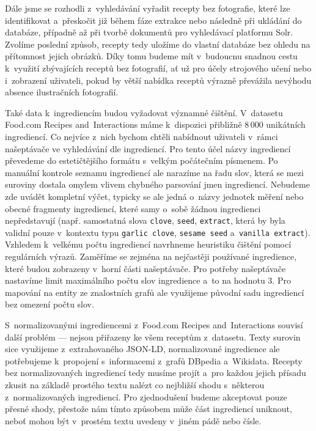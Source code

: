 Dále jsme se rozhodli z~vyhledávání vyřadit recepty bez fotografie, které lze identifikovat a~přeskočit již během fáze extrakce nebo následně při ukládání do databáze, případně až při tvorbě dokumentů pro vyhledávací platformu Solr. Zvolíme poslední způsob, recepty tedy uložíme do vlastní databáze bez ohledu na přítomnost jejich obrázků. Díky tomu budeme mít v~budoucnu snadnou cestu k~využití zbývajících receptů bez fotografií, ať už pro účely strojového učení nebo i~zobrazení uživateli, pokud by větší nabídka receptů výrazně převážila nevýhodu absence ilustračních fotografií.

Také data k~ingrediencím budou vyžadovat významné čištění. V~datasetu Food.com Recipes and~Interactions máme k~dispozici přibližně $8\,000$ unikátních ingrediencí. Co nejvíce z~nich bychom chtěli nabídnout uživateli v~rámci našeptávače ve vyhledávání dle ingrediencí. Pro tento účel názvy ingrediencí převedeme do estetičtějšího formátu s~velkým počátečním písmenem. Po manuální kontrole seznamu ingrediencí ale narazíme na řadu slov, která se mezi suroviny dostala omylem vlivem chybného parsování jmen ingrediencí. Nebudeme zde uvádět kompletní výčet, typicky se ale jedná o~názvy jednotek měření nebo obecné fragmenty ingrediencí, které samy o~sobě žádnou ingredienci nepředstavují (např. samostatná slova \texttt{clove}, \texttt{seed}, \texttt{extract}, která by byla validní pouze v~kontextu typu \texttt{garlic clove}, \texttt{sesame seed} a~\texttt{vanilla extract}). Vzhledem k~velkému počtu ingrediencí navrhneme heuristiku čištění pomocí regulárních výrazů. Zaměříme se zejména na nejčastěji používané ingredience, které budou zobrazeny v~horní části našeptávače. Pro potřeby našeptávače nastavíme limit maximálního počtu slov ingredience a~to na hodnotu $3$. Pro mapování na entity ze znalostních grafů ale využijeme původní sadu ingrediencí bez omezení počtu slov.

S~normalizovanými ingrediencemi z~Food.com Recipes and~Interactions souvisí další problém --- nejsou přiřazeny ke všem receptům z~datasetu. Texty surovin sice využijeme z~extrahovaného JSON-LD, normalizované ingredience ale potřebujeme k~propojení s~informacemi z~grafů DBpedia a~Wikidata. Recepty bez normalizovaných ingrediencí tedy musíme projít a~pro každou jejich přísadu zkusit na základě prostého textu nalézt co nejbližší shodu s~některou z~normalizovaných ingrediencí. Pro zjednodušení budeme akceptovat pouze přesné shody, přestože nám tímto způsobem může část ingrediencí uniknout, neboť mohou být v~prostém textu uvedeny v~jiném pádě nebo čísle.

